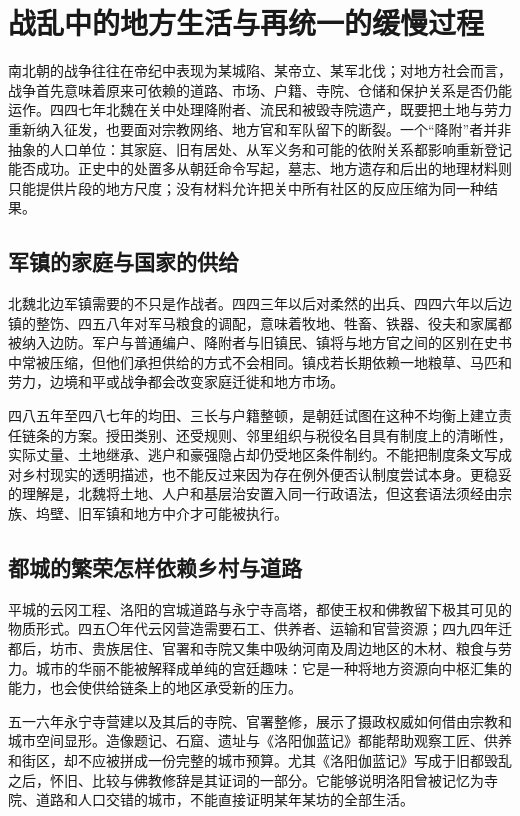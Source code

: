 \section{战乱中的地方生活与再统一的缓慢过程}
\label{sec:northern-southern-local-lives}

南北朝的战争往往在帝纪中表现为某城陷、某帝立、某军北伐；对地方社会而言，战争首先意味着原来可依赖的道路、市场、户籍、寺院、仓储和保护关系是否仍能运作。四四七年北魏在关中处理降附者、流民和被毁寺院遗产，既要把土地与劳力重新纳入征发，也要面对宗教网络、地方官和军队留下的断裂。一个“降附”者并非抽象的人口单位：其家庭、旧有居处、从军义务和可能的依附关系都影响重新登记能否成功。正史中的处置多从朝廷命令写起，墓志、地方遗存和后出的地理材料则只能提供片段的地方尺度；没有材料允许把关中所有社区的反应压缩为同一种结果。

\subsection{军镇的家庭与国家的供给}

北魏北边军镇需要的不只是作战者。四四三年以后对柔然的出兵、四四六年以后边镇的整饬、四五八年对军马粮食的调配，意味着牧地、牲畜、铁器、役夫和家属都被纳入边防。军户与普通编户、降附者与旧镇民、镇将与地方官之间的区别在史书中常被压缩，但他们承担供给的方式不会相同。镇戍若长期依赖一地粮草、马匹和劳力，边境和平或战争都会改变家庭迁徙和地方市场。

四八五年至四八七年的均田、三长与户籍整顿，是朝廷试图在这种不均衡上建立责任链条的方案。授田类别、还受规则、邻里组织与税役名目具有制度上的清晰性，实际丈量、土地继承、逃户和豪强隐占却仍受地区条件制约。不能把制度条文写成对乡村现实的透明描述，也不能反过来因为存在例外便否认制度尝试本身。更稳妥的理解是，北魏将土地、人户和基层治安置入同一行政语法，但这套语法须经由宗族、坞壁、旧军镇和地方中介才可能被执行。

\subsection{都城的繁荣怎样依赖乡村与道路}

平城的云冈工程、洛阳的宫城道路与永宁寺高塔，都使王权和佛教留下极其可见的物质形式。四五〇年代云冈营造需要石工、供养者、运输和官营资源；四九四年迁都后，坊市、贵族居住、官署和寺院又集中吸纳河南及周边地区的木材、粮食与劳力。城市的华丽不能被解释成单纯的宫廷趣味：它是一种将地方资源向中枢汇集的能力，也会使供给链条上的地区承受新的压力。

五一六年永宁寺营建以及其后的寺院、官署整修，展示了摄政权威如何借由宗教和城市空间显形。造像题记、石窟、遗址与《洛阳伽蓝记》都能帮助观察工匠、供养和街区，却不应被拼成一份完整的城市预算。尤其《洛阳伽蓝记》写成于旧都毁乱之后，怀旧、比较与佛教修辞是其证词的一部分。它能够说明洛阳曾被记忆为寺院、道路和人口交错的城市，不能直接证明某年某坊的全部生活。

